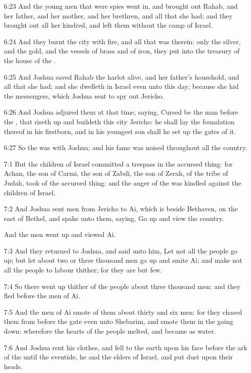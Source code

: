 6:23 And the young men that were spies went in, and brought out Rahab,
and her father, and her mother, and her brethren, and all that she
had; and they brought out all her kindred, and left them without the
camp of Israel.

6:24 And they burnt the city with fire, and all that was therein: only
the silver, and the gold, and the vessels of brass and of iron, they
put into the treasury of the house of the \LORD.

6:25 And Joshua saved Rahab the harlot alive, and her father's
household, and all that she had; and she dwelleth in Israel even unto
this day; because she hid the messengers, which Joshua sent to spy out
Jericho.

6:26 And Joshua adjured them at that time, saying, Cursed be the man
before the \LORD, that riseth up and buildeth this city Jericho: he
shall lay the foundation thereof in his firstborn, and in his youngest
son shall he set up the gates of it.

6:27 So the \LORD was with Joshua; and his fame was noised throughout
all the country.

7:1 But the children of Israel committed a trespass in the accursed
thing: for Achan, the son of Carmi, the son of Zabdi, the son of
Zerah, of the tribe of Judah, took of the accursed thing: and the
anger of the \LORD was kindled against the children of Israel.

7:2 And Joshua sent men from Jericho to Ai, which is beside Bethaven,
on the east of Bethel, and spake unto them, saying, Go up and view the
country.

And the men went up and viewed Ai.

7:3 And they returned to Joshua, and said unto him, Let not all the
people go up; but let about two or three thousand men go up and smite
Ai; and make not all the people to labour thither; for they are but
few.

7:4 So there went up thither of the people about three thousand men:
and they fled before the men of Ai.

7:5 And the men of Ai smote of them about thirty and six men: for they
chased them from before the gate even unto Shebarim, and smote them in
the going down: wherefore the hearts of the people melted, and became
as water.

7:6 And Joshua rent his clothes, and fell to the earth upon his face
before the ark of the \LORD until the eventide, he and the elders of
Israel, and put dust upon their heads.

